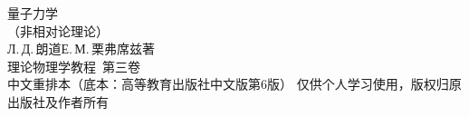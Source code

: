 \documentclass[11pt,a4paper,twoside,openright]{ctexbook}
\numberwithin{equation}{section}
\begin{document}
\begin{titlepage}
\thispagestyle{empty}
\centering
\vspace*{2.6cm}
{\heiti 量子力学}\\[0.8em]
{\kaishu （非相对论理论）}\\[1.2em]
{\kaishu Л.\,Д.\,朗道\quad Е.\,М.\,栗弗席兹\quad 著}\\[3em]
{\kaishu 理论物理学教程\ 第三卷}\\[2em]
{\kaishu 中文重排本（底本：高等教育出版社中文版第6版）}
\vfill
{\kaishu 仅供个人学习使用，版权归原出版社及作者所有}
\end{titlepage}

{\hypersetup{linktoc=all}\tableofcontents}
\clearpage





















\end{document}
